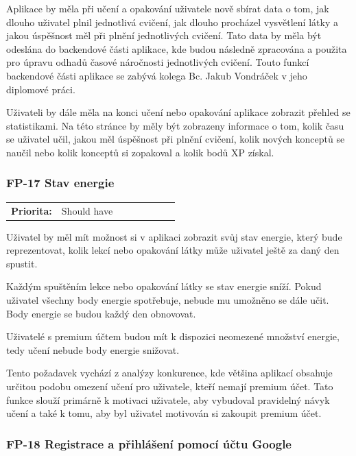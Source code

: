 Aplikace by měla při učení a opakování uživatele nově sbírat data o tom, jak dlouho uživatel plnil jednotlivá cvičení, jak dlouho procházel vysvětlení látky a jakou úspěšnost měl při plnění jednotlivých cvičení. Tato data by měla být odeslána do backendové části aplikace, kde budou následně zpracována a použita pro úpravu odhadů časové náročnosti jednotlivých cvičení. Touto funkcí backendové části aplikace se zabývá kolega Bc. Jakub Vondráček v jeho diplomové práci.

Uživateli by dále měla na konci učení nebo opakování aplikace zobrazit přehled se statistikami. Na této stránce by měly být zobrazeny informace o tom, kolik času se uživatel učil, jakou měl úspěšnost při plnění cvičení, kolik nových konceptů se naučil nebo kolik konceptů si zopakoval a kolik bodů XP získal.

\subsubsection{FP-17 Stav energie}\label{sec:fp-energy-status}

\begin{tabular}{lp{0.7\linewidth}}
    \textbf{Priorita:} & Should have \\
\end{tabular}

Uživatel by měl mít možnost si v aplikaci zobrazit svůj stav energie, který bude reprezentovat, kolik lekcí nebo opakování látky může uživatel ještě za daný den spustit.

Každým spuštěním lekce nebo opakování látky se stav energie sníží. Pokud uživatel všechny body energie spotřebuje, nebude mu umožněno se dále učit. Body energie se budou každý den obnovovat.

Uživatelé s premium účtem budou mít k dispozici neomezené množství energie, tedy učení nebude body energie snižovat.

Tento požadavek vychází z analýzy konkurence, kde většina aplikací obsahuje určitou podobu omezení učení pro uživatele, kteří nemají premium účet. Tato funkce slouží primárně k motivaci uživatele, aby vybudoval pravidelný návyk učení a také k tomu, aby byl uživatel motivován si zakoupit premium účet.


\subsubsection{FP-18 Registrace a přihlášení pomocí účtu Google}\label{sec:fp-google-auth}

